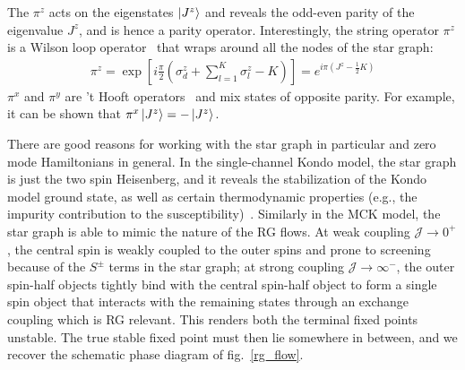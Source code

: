 \documentclass[reprint,prb,superscriptaddress]{revtex4-2}
\begin{document}
The \(\pi^z\) acts on the eigenstates \(\ket{J^z}\) and reveals the odd-even parity of the eigenvalue \(J^z\), and is hence a parity operator. Interestingly, {the string operator \(\pi^z\) is a Wilson loop operator~\cite{fradkin2013field} that wraps around all the nodes of the star graph}:
\begin{equation}\begin{aligned}
	\label{w_loop}
	\pi^z = \exp\left[i \frac{\pi}{2} \left(\sigma_d^z + \sum_{l=1}^K \sigma^z_l - K\right)\right] = e^{i \pi \left(J^z - \frac{1}{2}K\right)}
\end{aligned}\end{equation}
\(\pi^x\) and \(\pi^y\) are 't Hooft operators~\cite{fradkin2013field} and mix states of opposite parity. For example, it can be shown that \(\pi^x \ket{J^z} = -\ket{J^z}\).

There are good reasons for working with the star graph in particular and zero mode Hamiltonians in general.
In the single-channel Kondo model, the star graph is just the two spin Heisenberg, and it reveals the stabilization of the Kondo model ground state, as well as certain thermodynamic properties (e.g., the impurity contribution to the susceptibility)~\cite{varma_yafet_1976,yosida_1966,wilson1975renormalization,moca_zarand_2021,varma_yafet_1976,kondo_urg}.
Similarly in the MCK model, the star graph is able to mimic the nature of the RG flows. At weak coupling \({\mathcal{J}} \to 0^+\), the central spin is weakly coupled to the outer spins and  prone to screening because of the \(S^\pm\) terms in the star graph; at strong coupling \({\mathcal{J}} \to \infty^-\), the outer spin-half objects tightly bind with the central spin-half object to form a single spin object that interacts with the remaining states through an exchange coupling which is RG relevant.
This renders both the terminal fixed points unstable.
The true stable fixed point must then lie somewhere in between, and we recover the schematic phase diagram of fig.~\ref{rg_flow}. 
\end{document}

